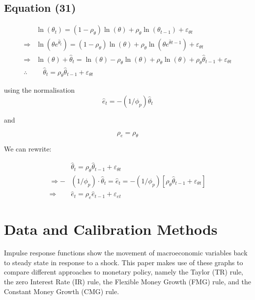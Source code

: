 \documentclass[11pt,preprint, authoryear]{elsarticle}
\numberwithin{equation}{section}
\numberwithin{figure}{section}
\numberwithin{table}{section}
\begin{document}
\hypertarget{equation-31}{%
\subsection{Equation (31)}\label{equation-31}}

\[\begin{aligned}
& \ln \left(\theta_{t}\right)=\left(1-\rho_{\theta}\right) \ln (\theta)+\rho_{\theta} \ln \left(\theta_{t-1}\right)+\varepsilon_{\theta t} \\
\Rightarrow & \ln \left(\theta e^{\hat{\theta}_{t}}\right)=\left(1-\rho_{\theta}\right) \ln (\theta)+\rho_{\theta} \ln \left(\theta e^{\hat{\theta}{t-1}}\right)+\varepsilon_{\theta t} \\
\Rightarrow & \ln (\theta)+\hat{\theta}_{t}=\ln (\theta)-\rho_{\theta} \ln (\theta)+\rho_{\theta} \ln (\theta)+\rho_{\theta} \hat{\theta}_{t-1}+\varepsilon_{\theta t} \\
\therefore & \quad \hat{\theta}_{t}=\rho_{\theta} \hat{\theta}_{t-1}+\varepsilon_{\theta t}
\end{aligned}\]

using the normalisation
\[\hat{e}_{t}=-\left(1 / \phi_{p}\right) \hat{\theta}_{t}\]

and

\[\rho_{e}=\rho_{\theta}\]

We can rewrite:

\[\begin{aligned}
&\hat{\theta}_{t}=\rho_{\theta} \hat{\theta}_{t-1}+\varepsilon_{\theta t}\\
\Rightarrow - & \left(1 / \phi_{p}\right) \cdot \hat{\theta}_{t} =  \hat{e}_t = -\left(1 / \phi_{p}\right) \left[ \rho_{\theta} \hat{\theta}_{t-1}+\varepsilon_{\theta t} \right]\\
\Rightarrow \quad &\hat{e}_t =  \rho_{e} \hat{e}_{t-1}+\varepsilon_{e t}
\end{aligned}\]

\newpage

\hypertarget{data-and-calibration-methods}{%
\section{Data and Calibration
Methods}\label{data-and-calibration-methods}}

Impulse response functions show the movement of macroeconomic variables
back to steady state in response to a shock. This paper makes use of
these graphs to compare different approaches to monetary policy, namely
the Taylor (TR) rule, the zero Interest Rate (IR) rule, the Flexible
Money Growth (FMG) rule, and the Constant Money Growth (CMG) rule.
\end{document}
